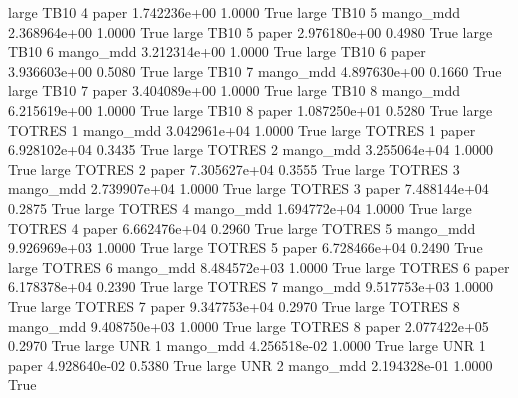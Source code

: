      large     TB10                 4                 paper 1.742236e+00      1.0000    True
     large     TB10                 5             mango_mdd 2.368964e+00      1.0000    True
     large     TB10                 5                 paper 2.976180e+00      0.4980    True
     large     TB10                 6             mango_mdd 3.212314e+00      1.0000    True
     large     TB10                 6                 paper 3.936603e+00      0.5080    True
     large     TB10                 7             mango_mdd 4.897630e+00      0.1660    True
     large     TB10                 7                 paper 3.404089e+00      1.0000    True
     large     TB10                 8             mango_mdd 6.215619e+00      1.0000    True
     large     TB10                 8                 paper 1.087250e+01      0.5280    True
     large   TOTRES                 1             mango_mdd 3.042961e+04      1.0000    True
     large   TOTRES                 1                 paper 6.928102e+04      0.3435    True
     large   TOTRES                 2             mango_mdd 3.255064e+04      1.0000    True
     large   TOTRES                 2                 paper 7.305627e+04      0.3555    True
     large   TOTRES                 3             mango_mdd 2.739907e+04      1.0000    True
     large   TOTRES                 3                 paper 7.488144e+04      0.2875    True
     large   TOTRES                 4             mango_mdd 1.694772e+04      1.0000    True
     large   TOTRES                 4                 paper 6.662476e+04      0.2960    True
     large   TOTRES                 5             mango_mdd 9.926969e+03      1.0000    True
     large   TOTRES                 5                 paper 6.728466e+04      0.2490    True
     large   TOTRES                 6             mango_mdd 8.484572e+03      1.0000    True
     large   TOTRES                 6                 paper 6.178378e+04      0.2390    True
     large   TOTRES                 7             mango_mdd 9.517753e+03      1.0000    True
     large   TOTRES                 7                 paper 9.347753e+04      0.2970    True
     large   TOTRES                 8             mango_mdd 9.408750e+03      1.0000    True
     large   TOTRES                 8                 paper 2.077422e+05      0.2970    True
     large      UNR                 1             mango_mdd 4.256518e-02      1.0000    True
     large      UNR                 1                 paper 4.928640e-02      0.5380    True
     large      UNR                 2             mango_mdd 2.194328e-01      1.0000    True
